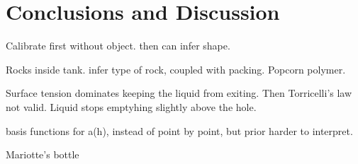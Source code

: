 \documentclass[openacc]{rsproca_new}%
\begin{document}
\section{Conclusions and Discussion}

Calibrate first without object. then can infer shape.

Rocks inside tank. infer type of rock, coupled with packing. Popcorn polymer.

Surface tension dominates keeping the liquid from exiting. Then Torricelli's law not valid. Liquid stops emptyhing slightly above the hole. 

basis functions for a(h), instead of point by point, but prior harder to interpret.

Mariotte's bottle \cite{kirevs2006mariotte}

\enlargethispage{20pt}




\vskip2pc



\end{document}
